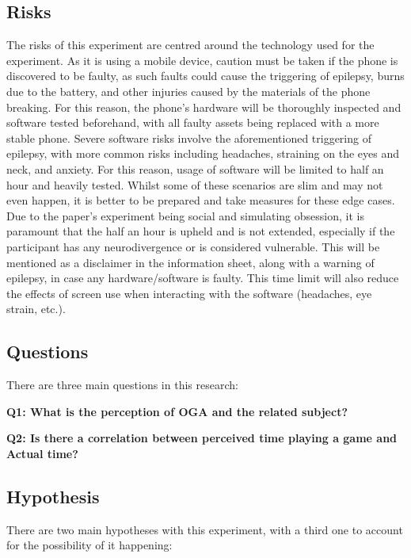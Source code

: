 \documentclass[conference]{IEEEtran}
\begin{document}
\subsection{Risks}
The risks of this experiment are centred around the technology used for the experiment. As it is using a mobile device, caution must be taken if the phone is discovered to be faulty, as such faults could cause the triggering of epilepsy, burns due to the battery, and other injuries caused by the materials of the phone breaking. For this reason, the phone's hardware will be thoroughly inspected and software tested beforehand, with all faulty assets being replaced with a more stable phone. Severe software risks involve the aforementioned triggering of epilepsy, with more common risks including headaches, straining on the eyes and neck, and anxiety. For this reason, usage of software will be limited to half an hour and heavily tested. Whilst some of these scenarios are slim and may not even happen, it is better to be prepared and take measures for these edge cases.\\

Due to the paper's experiment being social and simulating obsession, it is paramount that the half an hour is upheld and is not extended, especially if the participant has any neurodivergence or is considered vulnerable. This will be mentioned as a disclaimer in the information sheet, along with a warning of epilepsy, in case any hardware/software is faulty. This time limit will also reduce the effects of screen use when interacting with the software (headaches, eye strain, etc.). \\

\subsection{Questions}
There are three main questions in this research:

 \textbf{Q1: What is the perception of OGA and the related subject?}

 \textbf{Q2: Is there a correlation between perceived time playing a game and Actual time?}\\

\subsection{Hypothesis}
There are two main hypotheses with this experiment, with a third one to account for the possibility of it happening:
\end{document}
